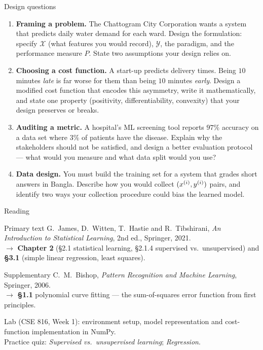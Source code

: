 \documentclass[aspectratio=169,10pt]{beamer}
\begin{document}
\begin{frame}{Design questions}
  \small
  \begin{enumerate}
    \item \textbf{Framing a problem.} The Chattogram City Corporation wants a
          system that predicts daily water demand for each ward. Design the
          formulation: specify $\mathcal{X}$ (what features you would record),
          $\mathcal{Y}$, the paradigm, and the performance measure $P$. State two
          assumptions your design relies on.  
    \item \textbf{Choosing a cost function.} A start-up predicts delivery times.
          Being $10$ minutes \emph{late} is far worse for them than being $10$
          minutes \emph{early}. Design a modified cost function that encodes this
          asymmetry, write it mathematically, and state one property (positivity,
          differentiability, convexity) that your design preserves or breaks.
           
    \item \textbf{Auditing a metric.} A hospital's ML screening tool reports
          $97\%$ accuracy on a data set where $3\%$ of patients have the disease.
          Explain why the stakeholders should not be satisfied, and design a
          better evaluation protocol --- what would you measure and what data
          split would you use? 
    \item \textbf{Data design.} You must build the training set for a system that
          grades short answers in Bangla. Describe how you would collect
          $(x^{(i)},y^{(i)})$ pairs, and identify two ways your collection
          procedure could bias the learned model. 
  \end{enumerate}
\end{frame}

\begin{frame}{Reading}
  \begin{block}{Primary text}
    G.~James, D.~Witten, T.~Hastie and R.~Tibshirani,
    \emph{An Introduction to Statistical Learning}, 2nd ed., Springer, 2021. \\[2pt]
    \hfill{\small$\rightarrow$ \textbf{Chapter 2} (\S2.1 statistical learning, \S2.1.4 supervised vs.\ unsupervised)
    and \textbf{\S3.1} (simple linear regression, least squares).}
  \end{block}
  \begin{block}{Supplementary}
    C.~M.~Bishop, \emph{Pattern Recognition and Machine Learning}, Springer, 2006. \\[2pt]
    \hfill{\small$\rightarrow$ \textbf{\S1.1} polynomial curve fitting --- the sum-of-squares error
    function from first principles.}
  \end{block}
  \vspace{2mm}
  \begin{center}
    \small\color{cugray}
    Lab (CSE 816, Week 1): environment setup, model representation and
    cost-function implementation in NumPy.\\
    Practice quiz: \emph{Supervised vs.\ unsupervised learning}; \emph{Regression}.
  \end{center}
\end{frame}
\end{document}
